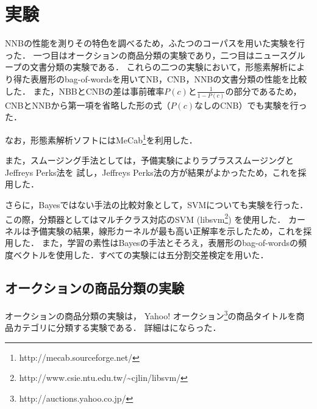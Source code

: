 \documentclass[japanese]{jnlp_1.4}
\begin{document}
\section{実験}
\label{Sec:実験}

NNBの性能を測りその特色を調べるため，ふたつのコーパスを用いた実験を行った．
一つ目はオークションの商品分類の実験であり，二つ目はニュースグループの文書分類の実験である．
これらの二つの実験において，形態素解析により得た表層形のbag-of-wordsを用いてNB，CNB，NNBの文書分類の性能を比較した．
また，NBBとCNBの差は事前確率$P(c)$と$ \frac{1}{1-P(c)}$の部分であるため，CNBとNNBから第一項を省略した形の式（$P(c)$なしのCNB）でも実験を行った．

なお，形態素解析ソフトにはMeCab\footnote{http://mecab.sourceforge.net/}を利用した．

また，スムージング手法としては，予備実験によりラプラススムージング\cite{ラプラス,ラプラス2}とJeffreys Perks法\cite{JeffreysPerks}を
試し，Jeffreys Perks法の方が結果がよかったため，これを採用した．

さらに，Bayesではない手法の比較対象として，SVMについても実験を行った．
この際，分類器としてはマルチクラス対応のSVM (libsvm\footnote{http://www.csie.ntu.edu.tw/{\textasciitilde}cjlin/libsvm/}) を使用した．
カーネルは予備実験の結果，線形カーネルが最も高い正解率を示したため，これを採用した．
また，学習の素性はBayesの手法とそろえ，表層形のbag-of-wordsの頻度ベクトルを使用した．すべての実験には五分割交差検定を用いた．


\subsection{オークションの商品分類の実験}
\label{Sec:オークションの商品分類の実験}

オークションの商品分類の実験は，
Yahoo! オークション\footnote{http://auctions.yahoo.co.jp/}の商品タイトルを商品カテゴリに分類する実験である．
詳細はにならった．
\end{document}
